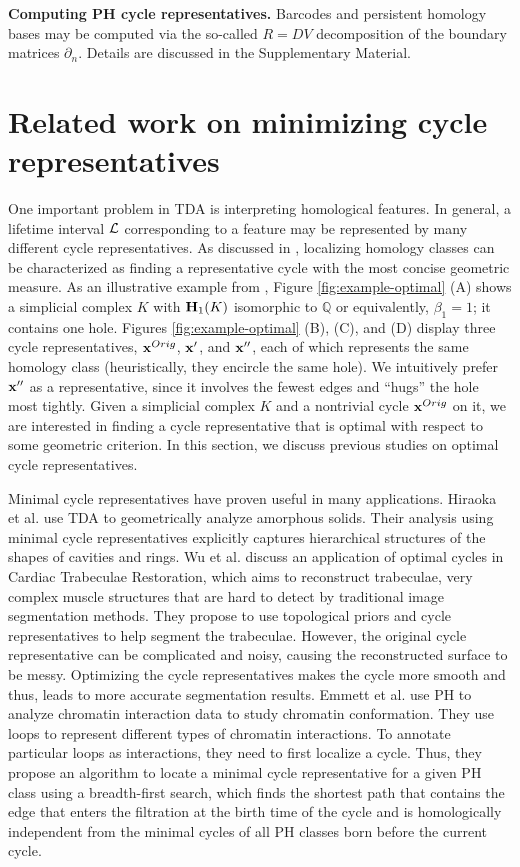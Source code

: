 \noindent \textbf{Computing PH cycle representatives.} Barcodes and persistent homology bases may be computed via the so-called $R = DV$ decomposition \cite{cohen2006vines} of the boundary matrices $\partial_n$. Details are discussed in the Supplementary Material.


\section{Related work on minimizing cycle representatives}\label{problem formulation}


One important problem in TDA is interpreting homological features. In general, a lifetime interval $\mathcal{L}$ corresponding to a feature may be represented by many different cycle representatives. As discussed in \cite{chenquantifying}, localizing homology classes can be characterized as finding a representative cycle with the most concise geometric measure. As an illustrative example from \cite{Escolar2016}, Figure \ref{fig:example-optimal} (A) shows a simplicial complex $K$ with $\mathbf{H}_1(K)$ isomorphic to $\mathbb{Q}$ or equivalently, $\beta_1=1$; it contains one hole.  Figures \ref{fig:example-optimal} (B), (C), and (D) display three cycle representatives, $\mathbf{x}^{Orig}$, $\mathbf{x}'$, and $\mathbf{x}''$, each of which represents the same homology class (heuristically, they encircle the same hole). We intuitively prefer $\mathbf{x}''$ as a representative, since it involves the fewest edges  and ``hugs'' the hole most tightly. Given a simplicial complex $K$ and a nontrivial cycle $\mathbf{x}^{Orig}$ on it, we are interested in finding a cycle representative that is optimal with respect to some geometric criterion. In this section, we discuss previous studies on optimal cycle representatives. 

Minimal cycle representatives have proven  useful in many applications. Hiraoka et al. \cite{Hiraoka7035} use TDA to geometrically analyze amorphous solids. Their analysis using minimal cycle representatives explicitly captures hierarchical structures of the shapes of cavities and rings. Wu et al. \cite{wu} discuss an application of optimal cycles in Cardiac Trabeculae Restoration, which aims to reconstruct trabeculae, very complex muscle structures that are hard to detect by traditional image segmentation methods. They propose to use topological priors and cycle representatives to help segment the trabeculae. However, the original cycle representative can be complicated and noisy, causing the reconstructed surface to be messy. Optimizing the cycle representatives makes the cycle more smooth and thus, leads to more accurate segmentation results. Emmett et al. \cite{emmett2015multiscale} use PH to analyze chromatin interaction data to study chromatin conformation. They use loops to represent different types of chromatin interactions. To annotate particular loops as interactions, they need to first localize a cycle. Thus, they propose an algorithm to locate a minimal cycle representative for a given PH class using a breadth-first search, which finds the shortest path that contains the edge that enters the filtration at the birth time of the cycle and is homologically independent from the minimal cycles of all PH classes born before the current cycle. 

